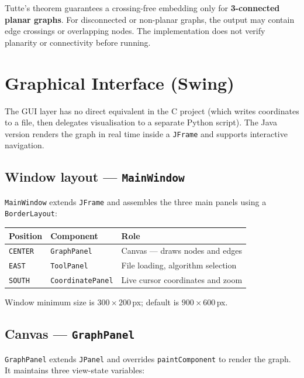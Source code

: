 \documentclass[12pt,a4paper]{article}
\begin{document}
Tutte's theorem guarantees a crossing-free embedding only for
\textbf{3-connected planar graphs}. For disconnected or non-planar graphs,
the output may contain edge crossings or overlapping nodes. The
implementation does not verify planarity or connectivity before running.

\section{Graphical Interface (Swing)}

The GUI layer has no direct equivalent in the C project (which writes
coordinates to a file, then delegates visualisation to a separate Python
script). The Java version renders the graph in real time inside a
\texttt{JFrame} and supports interactive navigation.

\subsection{Window layout — \texttt{MainWindow}}

\texttt{MainWindow} extends \texttt{JFrame} and assembles the three main
panels using a \texttt{BorderLayout}:

\begin{center}
\begin{tabular}{lll}
\toprule
\textbf{Position} & \textbf{Component} & \textbf{Role} \\
\midrule
\texttt{CENTER} & \texttt{GraphPanel}      & Canvas — draws nodes and edges \\
\texttt{EAST}   & \texttt{ToolPanel}       & File loading, algorithm selection \\
\texttt{SOUTH}  & \texttt{CoordinatePanel} & Live cursor coordinates and zoom \\
\bottomrule
\end{tabular}
\end{center}

Window minimum size is $300 \times 200$\,px; default is $900 \times 600$\,px.

\subsection{Canvas — \texttt{GraphPanel}}

\texttt{GraphPanel} extends \texttt{JPanel} and overrides
\texttt{paintComponent} to render the graph. It maintains three
view-state variables:
\end{document}
